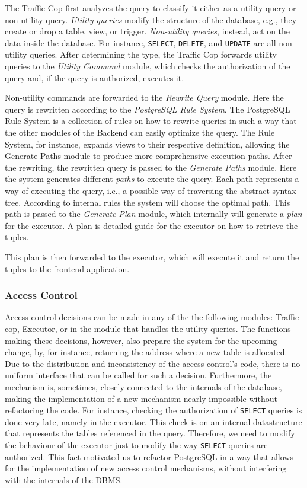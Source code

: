 The Traffic Cop first analyzes the query to classify it either as a {utility query} or {non-utility query}.
%
\emph{Utility queries} modify the structure of the database, e.g., they create or drop a table, view, or  trigger.
%
\emph{Non-utility queries}, instead, act on the data inside the database.
%
For instance, \texttt{SELECT}, \texttt{DELETE}, and \texttt{UPDATE} are all non-utility queries. 
%
After determining the type, the Traffic Cop forwards utility queries to the \emph{Utility Command} module, which checks the authorization of the query and, if the query is authorized, executes it.

Non-utility commands are forwarded to the \emph{Rewrite Query} module.
%
Here the query is rewritten according to the \emph{PostgreSQL Rule System}.
%
The PostgreSQL Rule System is a collection of rules on how to rewrite queries in such a way that the other modules of the Backend can easily optimize the query.
The Rule System, for instance, expands views to their respective definition, allowing the Generate Paths module to produce more comprehensive execution paths.
%
After the rewriting, the rewritten query is passed to the \emph{Generate Paths} module.
%
Here the system generates different \emph{paths} to execute the query.
%
Each path represents a way of executing the query, i.e., a possible way of traversing the abstract syntax tree.
%
According to internal rules the system will choose the optimal path.
%
This path is passed to the \emph{Generate Plan} module, which internally will generate a \emph{plan} for the executor.
%
A plan is detailed guide for the executor on how to retrieve the tuples.

This plan is then forwarded to the executor, which will execute it and return the tuples to the frontend application.
%
\subsubsection{Access Control}
%
Access control decisions can be made in any of the the following modules: Traffic cop, Executor, or in the module that handles the utility queries.
%
The functions making these decisions, however, also prepare the system for the upcoming change, by, for instance, returning the address where a new table is allocated.
%
Due to the distribution and inconsistency of the access control's code, there is no uniform interface that can be called for such a decision.
%
Furthermore,  the mechanism is, sometimes, closely connected to the internals of the database, making the implementation of a new mechanism nearly impossible without refactoring the code.
%
For instance, checking the authorization of \texttt{SELECT} queries is done very late, namely in the executor.
%
This check is on an internal datastructure that represents the tables referenced in the query.
%
Therefore, we need to modify the behaviour of the executor just to modify the way \texttt{SELECT} queries are authorized.
%
This fact motivated us to refactor PostgreSQL in a way that allows for the implementation of new access control mechanisms, without interfering with the internals of the DBMS.

